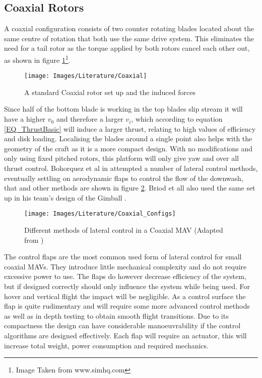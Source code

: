 	\subsection{Coaxial Rotors}
	A coaxial configuration consists of two counter rotating blades located about the same centre of rotation that both use the same drive system. This eliminates the need for a tail rotor as the torque applied by both rotors cancel each other out, as shown in figure \ref{IM_Coaxial}\footnote{Image Taken from www.simhq.com}.  
	
	\begin{figure}[H]
	\centering
	\texttt{[image: Images/Literature/Coaxial]}     
	\caption{A standard Coaxial rotor set up and the induced forces}
	\label{IM_Coaxial}
	\end{figure}
	
	Since half of the bottom blade is working in the top blades slip stream it will have a higher $v_0$ and therefore a larger $v_i$, which according to equation \eqref{EQ_ThrustBasic} will induce a larger thrust, relating to high values of efficiency and disk loading. Localising the blades around a single point also helps with the geometry of the craft as it is a more compact design. With no modifications and only using fixed pitched rotors, this platform will only give yaw and over all thrust control. Bohorquez et al in \cite{Bohorquez} attempted a number of lateral control methods, eventually settling on aerodynamic flaps to control the flow of the downwash, that and other methods are shown in figure \ref{IM_Coaxial_Variations}. Briod et all also used the same set up in his team's design of the Gimball \cite{Briod2012}.
	 
	\begin{figure}[H]
		\centering
		\texttt{[image: Images/Literature/Coaxial\_Configs]}     
		\caption{Different methods of lateral control in a Coaxial MAV (Adapted from \cite{Bohorquez})}
		\label{IM_Coaxial_Variations}
	\end{figure}
	
	The control flaps are the most common used form of lateral control for small coaxial MAVs. They introduce little mechanical complexity and do not require excessive power to use. The flaps do however decrease efficiency of the system, but if designed correctly should only influence the system while being used. For hover and vertical flight the impact will be negligible. As a control surface the flap is quite rudimentary and will require some more advanced control methods as well as in depth testing to obtain smooth flight transitions. Due to its compactness the design can have considerable manoeuvrability if the control algorithms are designed effectively. Each flap will require an actuator, this will increase total weight, power consumption and required mechanics. 
	
